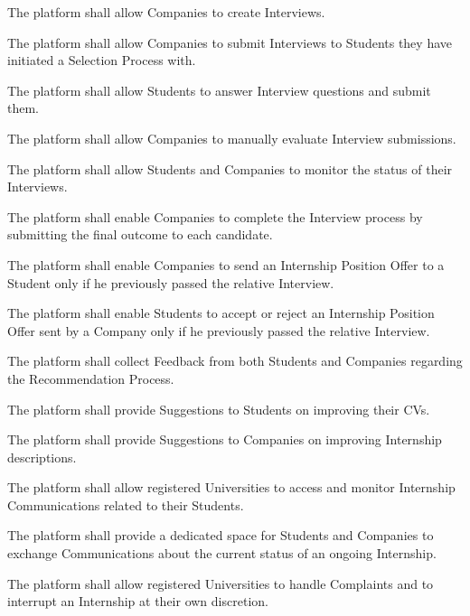 \begin{enumerate}[label={\color{titleColor}[R\arabic*]}]
    \item The platform shall allow Companies to create Interviews.
    \item The platform shall allow Companies to submit Interviews to Students they have initiated a Selection Process with.
    \item The platform shall allow Students to answer Interview questions and submit them.
    \item The platform shall allow Companies to manually evaluate Interview submissions.
    \item The platform shall allow Students and Companies to monitor the status of their Interviews.
    \item The platform shall enable Companies to complete the Interview process by submitting the final outcome to each candidate.

    \item The platform shall enable Companies to send an Internship Position Offer to a Student only if he previously passed the relative Interview.
    \item The platform shall enable Students to accept or reject an Internship Position Offer sent by a Company only if he previously passed the relative Interview.
    
    \item The platform shall collect Feedback from both Students and Companies regarding the Recommendation Process.
    \item The platform shall provide Suggestions to Students on improving their CVs.
    \item The platform shall provide Suggestions to Companies on improving Internship descriptions.
    
    \item The platform shall allow registered Universities to access and monitor Internship Communications related to their Students.
    \item The platform shall provide a dedicated space for Students and Companies to exchange Communications about the current status of an ongoing Internship.
    \item The platform shall allow registered Universities to handle Complaints and to interrupt an Internship at their own discretion.
\end{enumerate}


